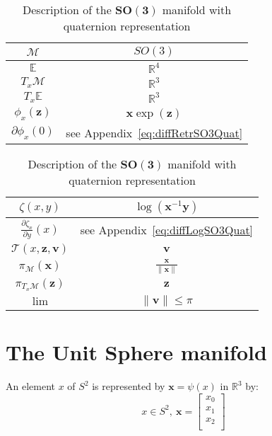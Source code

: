 \begin{table} [H]
\caption{Description of the $\mathbf{SO(3)}$ manifold with quaternion representation}
\centering
\begin{tabular}{cc}
  \toprule
  $\mathcal{M}$ & $SO(3)$ \\
  \midrule
  $\mathbb{E}$ & $\mathbb{R}^{4}$ \\
  \midrule
  $T_x\mathcal{M}$ & $\mathbb{R}^3$ \\
  \midrule
  $T_x\mathbb{E}$ & $\mathbb{R}^3$ \\
  \midrule
  $\phi_x(\mathbf{z})$ & $\mathbf{x}\exp(\mathbf{z})$ \\
  \midrule
  $\partial \phi_x(0)$ & see Appendix~\ref{eq:diffRetrSO3Quat} \\
  \bottomrule
\end{tabular}
\quad
\begin{tabular}{cc}
  \toprule
  $\zeta(x,y)$ & $\log(\mathbf{x}^{-1}\mathbf{y})$ \\
  \midrule
  $\frac{\partial \zeta_x}{\partial y}(x)$ & see Appendix~\ref{eq:diffLogSO3Quat} \\
  \midrule
  $\mathcal{T}(x,\mathbf{z}, \mathbf{v})$ & $\mathbf{v}$ \\
  \midrule
  $\pi_\mathcal{M}(\mathbf{x})$ & $\frac{\mathbf{x}}{\|\mathbf{x}\|}$ \\
  \midrule
  $\pi_{T_x\mathcal{M}}(\mathbf{z})$ & $\mathbf{z}$ \\
  \midrule
  $\lim$ & $\|\mathbf{v}\| \leq \pi$ \\
  \bottomrule
\end{tabular}
\end{table}



\section{The Unit Sphere manifold}
\label{sec:the_unit_sphere_manifold_s2}

An element $x$ of $S^2$ is represented by $\mathbf{x}=\psi(x)$ in $\mathbb{R}^{3}$ by:
\begin{equation}
  x\in S^2,\ \mathbf{x} =\begin{bmatrix}
    x_0\\
    x_1\\
    x_2\\
  \end{bmatrix}
\end{equation}

